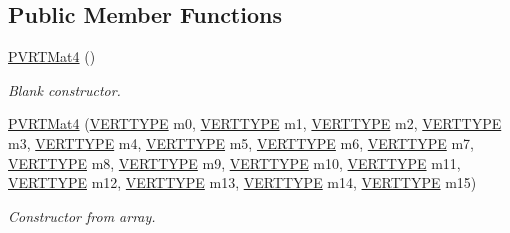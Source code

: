 \subsection*{Public Member Functions}
\begin{DoxyCompactItemize}
\item 
\hyperlink{struct_p_v_r_t_mat4_a92e508e35266fed4b96b2e26249ecb06}{P\+V\+R\+T\+Mat4} ()
\begin{DoxyCompactList}\small\item\em Blank constructor. \end{DoxyCompactList}\item 
\hyperlink{struct_p_v_r_t_mat4_aae79d8e70971676c0e1a62444e24af17}{P\+V\+R\+T\+Mat4} (\hyperlink{group___a_p_i___o_g_l_e_s_ga06da457b7d3e93368ab904f89e1396be}{V\+E\+R\+T\+T\+Y\+P\+E} m0, \hyperlink{group___a_p_i___o_g_l_e_s_ga06da457b7d3e93368ab904f89e1396be}{V\+E\+R\+T\+T\+Y\+P\+E} m1, \hyperlink{group___a_p_i___o_g_l_e_s_ga06da457b7d3e93368ab904f89e1396be}{V\+E\+R\+T\+T\+Y\+P\+E} m2, \hyperlink{group___a_p_i___o_g_l_e_s_ga06da457b7d3e93368ab904f89e1396be}{V\+E\+R\+T\+T\+Y\+P\+E} m3, \hyperlink{group___a_p_i___o_g_l_e_s_ga06da457b7d3e93368ab904f89e1396be}{V\+E\+R\+T\+T\+Y\+P\+E} m4, \hyperlink{group___a_p_i___o_g_l_e_s_ga06da457b7d3e93368ab904f89e1396be}{V\+E\+R\+T\+T\+Y\+P\+E} m5, \hyperlink{group___a_p_i___o_g_l_e_s_ga06da457b7d3e93368ab904f89e1396be}{V\+E\+R\+T\+T\+Y\+P\+E} m6, \hyperlink{group___a_p_i___o_g_l_e_s_ga06da457b7d3e93368ab904f89e1396be}{V\+E\+R\+T\+T\+Y\+P\+E} m7, \hyperlink{group___a_p_i___o_g_l_e_s_ga06da457b7d3e93368ab904f89e1396be}{V\+E\+R\+T\+T\+Y\+P\+E} m8, \hyperlink{group___a_p_i___o_g_l_e_s_ga06da457b7d3e93368ab904f89e1396be}{V\+E\+R\+T\+T\+Y\+P\+E} m9, \hyperlink{group___a_p_i___o_g_l_e_s_ga06da457b7d3e93368ab904f89e1396be}{V\+E\+R\+T\+T\+Y\+P\+E} m10, \hyperlink{group___a_p_i___o_g_l_e_s_ga06da457b7d3e93368ab904f89e1396be}{V\+E\+R\+T\+T\+Y\+P\+E} m11, \hyperlink{group___a_p_i___o_g_l_e_s_ga06da457b7d3e93368ab904f89e1396be}{V\+E\+R\+T\+T\+Y\+P\+E} m12, \hyperlink{group___a_p_i___o_g_l_e_s_ga06da457b7d3e93368ab904f89e1396be}{V\+E\+R\+T\+T\+Y\+P\+E} m13, \hyperlink{group___a_p_i___o_g_l_e_s_ga06da457b7d3e93368ab904f89e1396be}{V\+E\+R\+T\+T\+Y\+P\+E} m14, \hyperlink{group___a_p_i___o_g_l_e_s_ga06da457b7d3e93368ab904f89e1396be}{V\+E\+R\+T\+T\+Y\+P\+E} m15)
\begin{DoxyCompactList}\small\item\em Constructor from array. \end{DoxyCompactList}\item 

\end{DoxyCompactItemize}
